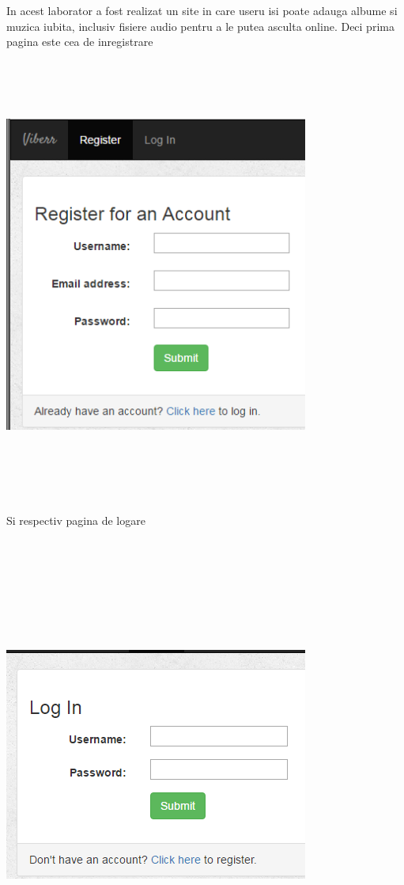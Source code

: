 \documentclass[a4paper, 12pt]{article}
\begin{document}
In acest laborator a fost realizat un site in care useru isi poate adauga albume si muzica iubita, inclusiv fisiere audio pentru a le putea asculta online.
Deci prima pagina este cea de inregistrare
\linebreak[4]
\includegraphics*[width=10cm, height=15cm]{reg}

Si respectiv pagina de logare

\includegraphics*[width=10cm, height=15cm]{log}
\end{document}
